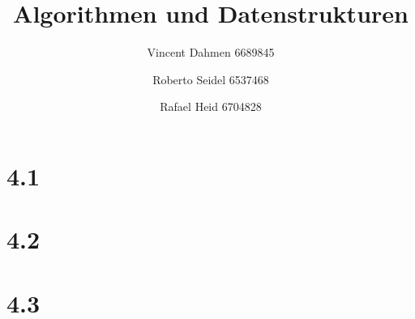 \documentclass[12pt,a4paper]{article}
\title{Algorithmen und Datenstrukturen}
\author{Vincent Dahmen 6689845 \and Roberto Seidel 6537468 \and Rafael Heid 6704828}
\begin{document}
\maketitle{}


\section*{4.1}


\section*{4.2}


\section*{4.3}

\end{document}
